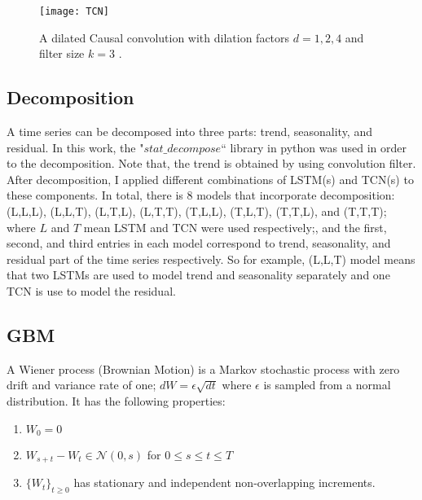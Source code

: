 \documentclass[12pt, A4]{article}
\begin{document}
\begin{figure}[H]
	\centering
	\texttt{[image: TCN]}
	\caption{A dilated Causal convolution with dilation factors $d=1,2,4$ and filter size $k=3$ \cite{bai2018empirical}.}
	\label{TCN_arch}
\end{figure}

\subsection{Decomposition}
A time series can be decomposed into three parts: trend, seasonality, and residual. In this work, the "$stat\_decompose$`` library in python was used in order to the decomposition. Note that, the trend is obtained by using convolution filter. After decomposition, I applied different combinations of LSTM(s) and TCN(s) to these components. In total, there is $8$ models that incorporate decomposition: (L,L,L), (L,L,T), (L,T,L), (L,T,T), (T,L,L), (T,L,T), (T,T,L), and (T,T,T); where $L$ and $T$ mean LSTM  and TCN were used respectively;, and the first, second, and third entries in each model correspond to trend, seasonality, and residual part of the time series respectively. So for example, (L,L,T) model means that two LSTMs are used to model trend and seasonality separately and one TCN is use to model the residual. \\

\subsection{GBM}

A Wiener process (Brownian Motion) is a Markov stochastic process with zero drift and variance rate of one; $dW = \epsilon \sqrt{dt}$ where $\epsilon$ is sampled from a normal distribution. It has the following properties:
\begin{enumerate}
	\item $W_{0}=0$
	\item $W_{s+t}-W_{t} \in \mathcal{N}(0,s)$ for $0\leq s\leq t \leq T$
	\item $\{W_{t}\}_{t\geq 0}$ has stationary and independent non-overlapping increments. 
\end{enumerate}
 
\end{document}
